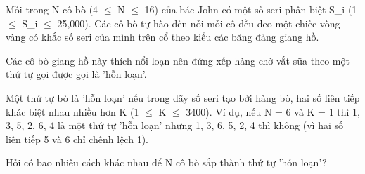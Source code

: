 Mỗi trong N cô bò (4  $\le$  N  $\le$  16) của bác John có một số seri phân biệt S\_i (1  $\le$  S\_i  $\le$  25,000). Các cô bò tự hào đến nỗi mỗi cô đều đeo một chiếc vòng vàng có khắc số seri của mình trên cổ theo kiểu các băng đảng giang hồ.  

   Các cô bò giang hồ này thích nổi loạn nên đứng xếp hàng chờ vắt sữa theo một thứ tự gọi được gọi là 'hỗn loạn'.  

   Một thứ tự bò là 'hỗn loạn' nếu trong dãy số seri tạo bởi hàng bò, hai số liên tiếp khác biệt nhau nhiều hơn K (1  $\le$  K  $\le$  3400). Ví dụ, nếu N = 6 và K = 1 thì 1, 3, 5, 2, 6, 4 là một thứ tự 'hỗn loạn' nhưng 1, 3, 6, 5, 2, 4 thì không (vì hai số liên tiếp 5 và 6 chỉ chênh lệch 1).  

   Hỏi có bao nhiêu cách khác nhau để N cô bò sắp thành thứ tự 'hỗn loạn'?  

\
